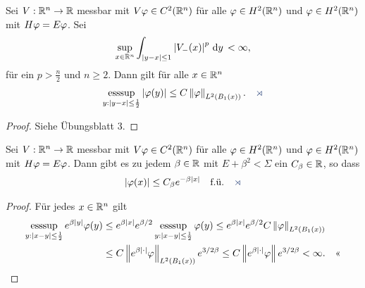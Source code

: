 \begin{prop}
\label{prop:2.3}
Sei $V:\mathbb{R}^n\to\mathbb{R}$ messbar mit $V\varphi\in C^2(\mathbb{R}^n)$ für alle $\varphi\in H^2(\mathbb{R}^n)$
und $\varphi\in H^2(\mathbb{R}^n)$ mit $H\varphi = E\varphi$. Sei
\begin{align*}
\sup\limits_{x\in\mathbb{R}^n} \int_{\left|y-x\right|\le 1}
\left|V_-(x)\right|^p\,\mathrm{d} y\, < \infty,
\end{align*}
für ein $p>\frac{n}{2}$ und $n\ge 2$. Dann gilt für alle $x\in\mathbb{R}^n$
\begin{align*}
\esssup\limits_{y:\abs{y-x}\le \frac{1}{2}} \abs{\ph(y)} \le
C\norm{\ph}_{L^2(B_1(x))}.\fishhere
\end{align*}
\end{prop}
\begin{proof}
Siehe Übungsblatt 3.\qedhere
\end{proof}

\begin{cor}
\label{prop:2.4}
Sei $V:\mathbb{R}^n\to\mathbb{R}$ messbar mit $V\varphi\in C^2(\mathbb{R}^n)$ für alle $\varphi\in H^2(\mathbb{R}^n)$
und $\varphi\in H^2(\mathbb{R}^n)$ mit $H\varphi = E\varphi$. Dann gibt es zu jedem $\beta\in\mathbb{R}$
mit $E+\beta^2<\Sigma$ ein $C_\beta \in\mathbb{R}$, so dass
\begin{align*}
\abs{\ph(x)} \le C_\beta e^{-\beta\abs{x}}\quad \text{f.ü.}\fishhere
\end{align*}
\end{cor}
\begin{proof}
Für jedes $x\in\mathbb{R}^n$ gilt
\begin{align*}
\mathop{\mathrm{ess sup}}\limits_{y: \left|x-y\right|\le \frac{1}{2}}
e^{\beta\left|y\right|}\varphi(y)
&\le
e^{\beta \left|x\right|}
e^{\beta/2}
\mathop{\mathrm{ess sup}}\limits_{y: \left|x-y\right|\le \frac{1}{2}}
\varphi(y)
\le
e^{\beta \left|x\right|}
e^{\beta/2}
C\left\|\varphi\right\|_{L^2(B_1(x))}\\
&\le
C\left\|e^{\beta\left|\cdot\right|}\varphi\right\|_{L^2(B_1(x))}
e^{3/2\beta}
\le
C\left\|e^{\beta\left|\cdot\right|}\varphi\right\|
e^{3/2\beta}
< \infty.\quad\text{<<}
\end{align*}
\end{proof}

